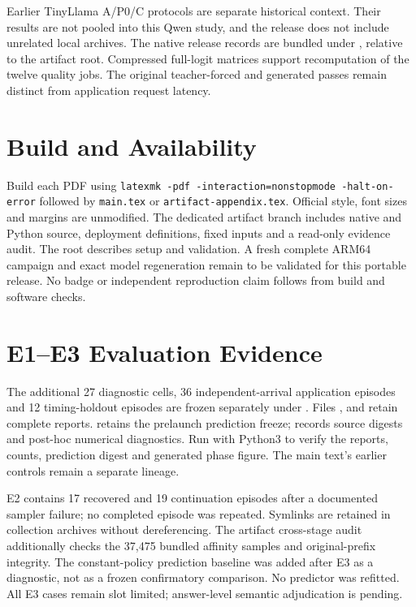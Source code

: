 \documentclass{article}
\begin{document}
Earlier TinyLlama A/P0/C protocols are separate historical context. Their
results are not pooled into this Qwen study, and the release does not include
unrelated local archives. The native release records are bundled under
, relative to the artifact root. Compressed
full-logit matrices support recomputation of the twelve quality jobs. The
original teacher-forced and generated passes remain distinct from application
request latency.

\section{Build and Availability}
Build each PDF using \texttt{latexmk -pdf -interaction=nonstopmode -halt-on-error}
followed by \texttt{main.tex} or \texttt{artifact-appendix.tex}. Official style,
font sizes and margins are unmodified. The dedicated artifact branch includes
native and Python source, deployment definitions, fixed inputs and a read-only
evidence audit. The root  describes setup and validation.
A fresh complete ARM64 campaign and exact model regeneration remain to be
validated for this portable release. No badge or independent reproduction
claim follows from build and software checks.
\section{E1--E3 Evaluation Evidence}
The additional 27 diagnostic cells, 36 independent-arrival application episodes
and 12 timing-holdout episodes are frozen separately under
. Files ,  and
 retain complete reports.  retains the
prelaunch prediction freeze;  records source digests and
post-hoc numerical diagnostics. Run  with Python3
to verify the reports, counts, prediction digest and generated phase figure.
The main text's earlier controls remain a separate lineage.

E2 contains 17 recovered and 19 continuation episodes after a documented
sampler failure; no completed episode was repeated. Symlinks are retained in
collection archives without dereferencing. The artifact cross-stage audit additionally checks the 37,475 bundled
affinity samples and original-prefix integrity.
The constant-policy prediction baseline was added after E3 as a diagnostic,
not as a frozen confirmatory comparison. No predictor was refitted. All E3
cases remain slot limited; answer-level semantic adjudication is pending.
\end{document}
